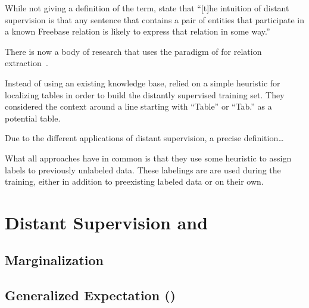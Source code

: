 While not giving a definition of the term, \citet{mintz2009distant} state that ``[t]he intuition of distant supervision is that any sentence that contains a pair of entities that participate in a known Freebase relation is likely to express that relation in some way.''

There is now a body of research that uses the paradigm of \citet{mintz2009distant} for relation extraction~\citep{benson2011event,ritter2011named}.

\bigskip


Instead of using an existing knowledge base, \citet{fan2015detecting} relied on a simple heuristic for localizing tables in order to build the distantly supervised training set.
They considered the context around a line starting with ``Table'' or ``Tab.'' as a potential table.

Due to the different applications of \gls{distant supervision}, a precise definition\dots

What all approaches have in common is that they use some heuristic to assign labels to previously unlabeled data. These labelings are are used during the training, either in addition to preexisting labeled data or on their own.



\section{Distant Supervision and }

\subsection{Marginalization}

\subsection{Generalized Expectation ()}




